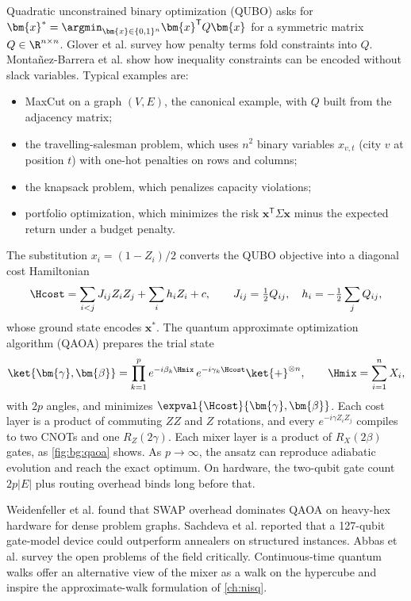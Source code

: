 Quadratic unconstrained binary optimization (QUBO) asks for $\bm{x}^{\ast}=\argmin_{\bm{x}\in\{0,1\}^n}\bm{x}^{\mathsf{T}}Q\bm{x}$ for a symmetric matrix $Q\in\R^{n\times n}$. Glover et al. \cite{glover2018qubo} survey how penalty terms fold constraints into $Q$. Monta{\~n}ez-Barrera et al. \cite{montanezbarrera2024unbalanced} show how inequality constraints can be encoded without slack variables. Typical examples are:
\begin{itemize}
\item MaxCut on a graph $(V,E)$, the canonical example, with $Q$ built from the adjacency matrix;
\item the travelling-salesman problem, which uses $n^2$ binary variables $x_{v,t}$ (city $v$ at position $t$) with one-hot penalties on rows and columns;
\item the knapsack problem, which penalizes capacity violations;
\item portfolio optimization, which minimizes the risk $\bm{x}^{\mathsf{T}}\Sigma\bm{x}$ minus the expected return under a budget penalty.
\end{itemize}
The substitution $x_i=(1-Z_i)/2$ converts the QUBO objective into a diagonal cost Hamiltonian
\begin{equation}\label{eq:bg:hcost}
\Hcost=\sum_{i<j}J_{ij}Z_iZ_j+\sum_{i}h_iZ_i+c,\qquad J_{ij}=\tfrac12Q_{ij},\quad h_i=-\tfrac12\sum_{j}Q_{ij},
\end{equation}
whose ground state encodes $\bm{x}^{\ast}$. The quantum approximate optimization algorithm (QAOA) \cite{farhi2014qaoa} prepares the trial state
\begin{equation}\label{eq:bg:qaoa}
\ket{\bm{\gamma},\bm{\beta}}=\prod_{k=1}^{p}e^{-i\beta_k\Hmix}\,e^{-i\gamma_k\Hcost}\ket{+}^{\otimes n},\qquad \Hmix=\sum_{i=1}^{n}X_i,
\end{equation}
with $2p$ angles, and minimizes $\expval{\Hcost}{\bm{\gamma},\bm{\beta}}$. Each cost layer is a product of commuting $ZZ$ and $Z$ rotations, and every $e^{-i\gamma Z_iZ_j}$ compiles to two CNOTs and one $R_Z(2\gamma)$. Each mixer layer is a product of $R_X(2\beta)$ gates, as \cref{fig:bg:qaoa} shows. As $p\to\infty$, the ansatz can reproduce adiabatic evolution and reach the exact optimum. On hardware, the two-qubit gate count $2p|E|$ plus routing overhead binds long before that.

Weidenfeller et al. \cite{weidenfeller2022qaoascaling} found that SWAP overhead dominates QAOA on heavy-hex hardware for dense problem graphs. Sachdeva et al. \cite{sachdeva2024qaoa127} reported that a 127-qubit gate-model device could outperform annealers on structured instances. Abbas et al. \cite{abbas2024challengesqopt} survey the open problems of the field critically. Continuous-time quantum walks \cite{childs2009quantumwalk} offer an alternative view of the mixer as a walk on the hypercube and inspire the approximate-walk formulation of \cref{ch:nisq}.

